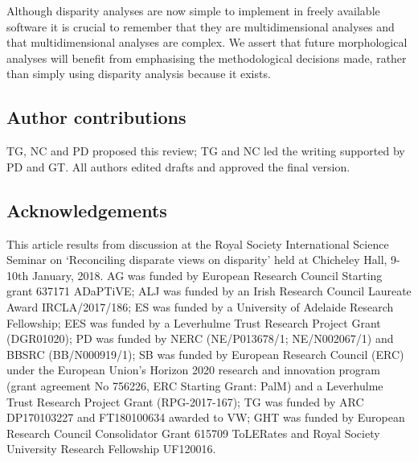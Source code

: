 \documentclass[12pt,letterpaper]{article}
\begin{document}
Although disparity analyses are now simple to implement in freely available software \citep{Bouxin2005, oksanen2007vegan, Harmon2008, lloyd2016, Guillerme2018b} it is crucial to remember that they are multidimensional analyses and that multidimensional analyses are complex.
We assert that future morphological analyses will benefit from emphasising the methodological decisions made, rather than simply using disparity analysis because it exists.

\subsection{Author contributions}

TG, NC and PD proposed this review; TG and NC led the writing supported by PD and GT.
All authors edited drafts and approved the final version.

\subsection{Acknowledgements}

This article results from discussion at the Royal Society International Science Seminar on `Reconciling disparate views on disparity' held at Chicheley Hall, 9-10th January, 2018.
AG was funded by European Research Council Starting grant 637171 ADaPTiVE;
ALJ was funded by an Irish Research Council Laureate Award IRCLA/2017/186;
ES was funded by a University of Adelaide Research Fellowship;
EES was funded by a Leverhulme Trust Research Project Grant (DGR01020);
PD was funded by NERC (NE/P013678/1; NE/N002067/1) and BBSRC (BB/N000919/1);
SB was funded by European Research Council (ERC) under the European Union's Horizon 2020 research and innovation program (grant agreement No 756226, ERC Starting Grant: PalM) and a Leverhulme Trust Research Project Grant (RPG-2017-167);
TG was funded by ARC DP170103227 and FT180100634 awarded to VW;
GHT was funded by European Research Council Consolidator Grant 615709 ToLERates and Royal Society University Research Fellowship UF120016.



\end{document}
